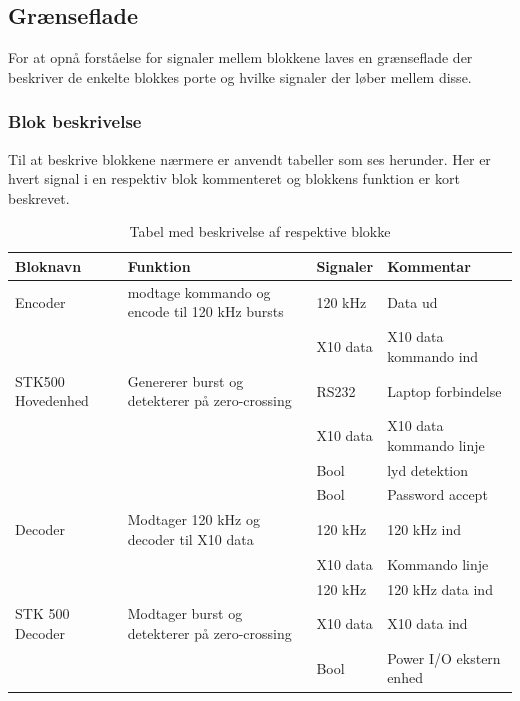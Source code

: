 \begin{table}[htbp] %
\subsection{Grænseflade}
For at opnå forståelse for signaler mellem blokkene laves en grænseflade der beskriver de enkelte blokkes porte og hvilke signaler der løber mellem disse.

\subsubsection{Blok beskrivelse}
Til at beskrive blokkene nærmere er anvendt tabeller som ses herunder. Her er hvert signal i en respektiv blok kommenteret og blokkens funktion er kort beskrevet. 

\caption{Tabel med beskrivelse af respektive blokke}
\begin{small}
\begin{tabular}{|p{}|p{}|p{}|p{}|}
\hline
\textbf{Bloknavn} & \textbf{Funktion} & \textbf{Signaler} & \textbf{Kommentar} \\ \hline

Encoder & modtage kommando og encode til 120 kHz bursts & 120 kHz & Data ud \\ \cline{3-4}	
& & X10 data & X10 data kommando ind \\ \hline

STK500 Hovedenhed & Genererer burst og detekterer på zero-crossing & RS232 & Laptop forbindelse \\ \cline{3-4}
& & X10 data & X10 data kommando linje \\ \cline{3-4}
& & Bool & lyd detektion \\ \cline{3-4}
& & Bool & Password accept \\ \hline

Decoder & Modtager 120 kHz og decoder til X10 data & 120 kHz & 120 kHz ind \\ \cline{3-4}
& & X10 data & Kommando linje \\ \cline{3-4}
& & 120 kHz & 120 kHz data ind \\ \hline

STK 500 Decoder & Modtager burst og detekterer på zero-crossing & X10 data & X10 data ind \\ \cline{3-4}
&& Bool & Power I/O ekstern enhed \\ \hline 
\end{tabular}
\end{small}
\label{table:Bloktabel}
\end{table}


